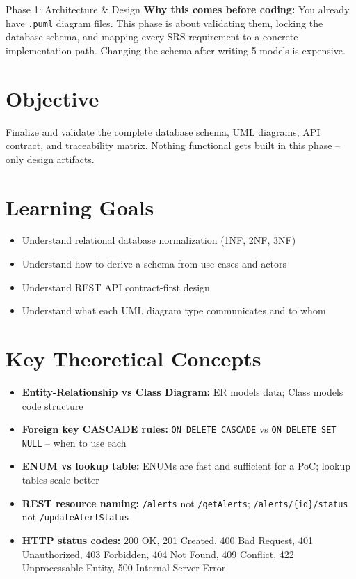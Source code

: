 \documentclass[11pt,a4paper]{report}
\begin{document}
\begin{phasebox}{Phase 1: Architecture \& Design}
\textbf{Why this comes before coding:} You already have \texttt{.puml} diagram files. This phase is about validating them, locking the database schema, and mapping every SRS requirement to a concrete implementation path. Changing the schema after writing 5 models is expensive.
\end{phasebox}

\section*{Objective}
Finalize and validate the complete database schema, UML diagrams, API contract, and traceability matrix. Nothing functional gets built in this phase -- only design artifacts.

\section*{Learning Goals}
\begin{itemize}
    \item Understand relational database normalization (1NF, 2NF, 3NF)
    \item Understand how to derive a schema from use cases and actors
    \item Understand REST API contract-first design
    \item Understand what each UML diagram type communicates and to whom
\end{itemize}

\section*{Key Theoretical Concepts}
\begin{itemize}
    \item \textbf{Entity-Relationship vs Class Diagram:} ER models data; Class models code structure
    \item \textbf{Foreign key CASCADE rules:} \texttt{ON DELETE CASCADE} vs \texttt{ON DELETE SET NULL} -- when to use each
    \item \textbf{ENUM vs lookup table:} ENUMs are fast and sufficient for a PoC; lookup tables scale better
    \item \textbf{REST resource naming:} \texttt{/alerts} not \texttt{/getAlerts}; \texttt{/alerts/\{id\}/status} not \texttt{/updateAlertStatus}
    \item \textbf{HTTP status codes:} 200 OK, 201 Created, 400 Bad Request, 401 Unauthorized, 403 Forbidden, 404 Not Found, 409 Conflict, 422 Unprocessable Entity, 500 Internal Server Error
\end{itemize}
\end{document}
